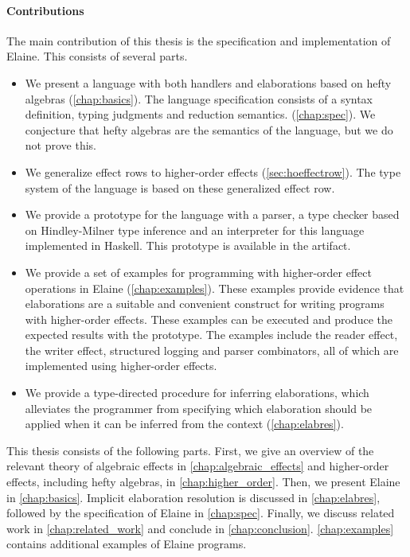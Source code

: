 \paragraph{Contributions} The main contribution of this thesis is the specification and implementation of Elaine. This consists of several parts.
%
\begin{itemize}
    \item We present a language with both handlers and elaborations based on hefty algebras (\cref{chap:basics}). The language specification consists of a syntax definition, typing judgments and reduction semantics. (\cref{chap:spec}). We conjecture that hefty algebras are the semantics of the language, but we do not prove this.
    \item We generalize effect rows to higher-order effects (\cref{sec:hoeffectrow}). The type system of the language is based on these generalized effect row.
    \item We provide a prototype for the language with a parser, a type checker based on Hindley-Milner type inference and an interpreter for this language implemented in Haskell. This prototype is available in the artifact.
    \item We provide a set of examples for programming with higher-order effect operations in Elaine (\cref{chap:examples}). These examples provide evidence that elaborations are a suitable and convenient construct for writing programs with higher-order effects. These examples can be executed and produce the expected results with the prototype. The examples include the reader effect, the writer effect, structured logging and parser combinators, all of which are implemented using higher-order effects.
    \item We provide a type-directed procedure for inferring elaborations, which alleviates the programmer from specifying which elaboration should be applied when it can be inferred from the context (\cref{chap:elabres}).
\end{itemize}
%
This thesis consists of the following parts. First, we give an overview of the relevant theory of algebraic effects in \cref{chap:algebraic_effects} and higher-order effects, including hefty algebras, in \cref{chap:higher_order}. Then, we present Elaine in \cref{chap:basics}. Implicit elaboration resolution is discussed in \cref{chap:elabres}, followed by the specification of Elaine in \cref{chap:spec}. Finally, we discuss related work in \cref{chap:related_work} and conclude in \cref{chap:conclusion}. \cref{chap:examples} contains additional examples of Elaine programs.


